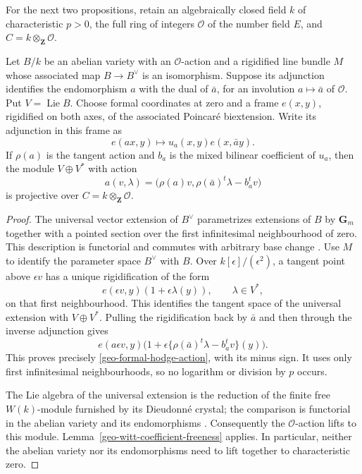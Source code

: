 For the next two propositions, retain an algebraically closed field
$k$ of characteristic $p>0$, the full ring of integers $\mathcal O$
of the number field $E$, and $C=k\otimes_{\mathbf Z}\mathcal O$.

\begin{proposition}\label{geo-proper-formal-hodge-comparison}
Let $B/k$ be an abelian variety with an $\mathcal O$-action and a
rigidified line bundle $M$ whose associated map $B\to B^\vee$ is an
isomorphism. Suppose its adjunction identifies the endomorphism
$a$ with the dual of $\bar a$, for an involution
$a\mapsto\bar a$ of $\mathcal O$.
Put $V=\operatorname{Lie}B$.
Choose formal coordinates at zero and a frame $e(x,y)$, rigidified
on both axes, of the associated Poincar\'e biextension.
Write its adjunction in this frame as
\[
             e(ax,y)\longmapsto u_a(x,y)e(x,\bar a y).
\]
If $\rho(a)$ is the tangent action and
$b_a$ is the mixed bilinear coefficient of $u_a$, then the module
$V\oplus V^*$ with action
\begin{equation}\label{geo-formal-hodge-action}
       a(v,\lambda)=
       \bigl(\rho(a)v,\rho(\bar a)^t\lambda-b_a^t v\bigr)
\end{equation}
is projective over $C=k\otimes_{\mathbf Z}\mathcal O$.
\end{proposition}
\begin{proof}
The universal vector extension of $B^\vee$ parametrizes extensions
of $B$ by $\mathbf G_m$ together with a pointed section over the
first infinitesimal neighbourhood of zero. This description is
functorial and commutes with arbitrary base change
\cite[I, \S2.1 and Proposition 2.6.7]{mazur-messing-universal}.
Use $M$ to identify the parameter space $B^\vee$ with $B$.
Over $k[\epsilon]/(\epsilon^2)$, a tangent point above $\epsilon v$
has a unique rigidification of the form
\[
                  e(\epsilon v,y)(1+\epsilon\lambda(y)),
                 \qquad \lambda\in V^*,
\]
on that first neighbourhood. This identifies the tangent space
of the universal extension with $V\oplus V^*$.
Pulling the rigidification back by $\bar a$ and then through the
inverse adjunction gives
\[
 e(a\epsilon v,y)
 \bigl(1+\epsilon\{\rho(\bar a)^t\lambda-b_a^t v\}(y)\bigr).
\]
This proves precisely \eqref{geo-formal-hodge-action}, with its
minus sign. It uses only first infinitesimal neighbourhoods, so
no logarithm or division by $p$ occurs.

The Lie algebra of the universal extension is the reduction of
the finite free $W(k)$-module furnished by its Dieudonn\'e crystal;
the comparison is functorial in the abelian variety and its
endomorphisms
\cite[II, \S9, \S13 and \S15]{mazur-messing-universal}.
Consequently the $\mathcal O$-action lifts to this module.
Lemma~\ref{geo-witt-coefficient-freeness} applies. In particular,
neither the abelian variety nor its endomorphisms need to lift
together to characteristic zero.
\end{proof}


